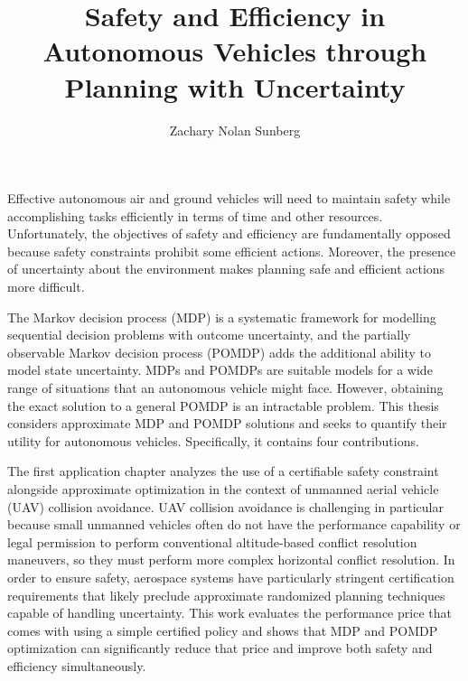\documentclass[12pt]{report}
\title{Safety and Efficiency in Autonomous Vehicles through Planning with Uncertainty}
\author{Zachary Nolan Sunberg}
\begin{document}
\beforepreface 


Effective autonomous air and ground vehicles will need to maintain safety while accomplishing tasks efficiently in terms of time and other resources.
Unfortunately, the objectives of safety and efficiency are fundamentally opposed because safety constraints prohibit some efficient actions.
Moreover, the presence of uncertainty about the environment makes planning safe and efficient actions more difficult.

The Markov decision process (MDP) is a systematic framework for modelling sequential decision problems with outcome uncertainty, and the partially observable Markov decision process (POMDP) adds the additional ability to model state uncertainty.
MDPs and POMDPs are suitable models for a wide range of situations that an autonomous vehicle might face.
However, obtaining the exact solution to a general POMDP is an intractable problem. %
This thesis considers approximate MDP and POMDP solutions and seeks to quantify their utility for autonomous vehicles.
Specifically, it contains four contributions.

The first application chapter analyzes the use of a certifiable safety constraint alongside approximate optimization in the context of unmanned aerial vehicle (UAV) collision avoidance.
UAV collision avoidance is challenging in particular because small unmanned vehicles often do not have the performance capability or legal permission to perform conventional altitude-based conflict resolution maneuvers, so they must perform more complex horizontal conflict resolution.
In order to ensure safety, aerospace systems have particularly stringent certification requirements that likely preclude approximate randomized planning techniques capable of handling uncertainty.
This work evaluates the performance price that comes with using a simple certified policy and shows that MDP and POMDP optimization can significantly reduce that price and improve both safety and efficiency simultaneously.
\end{document}
